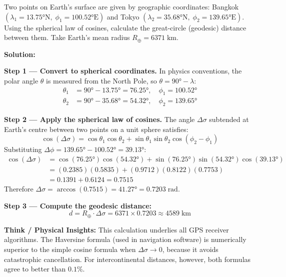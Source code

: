 \begin{psctexample}
Two points on Earth's surface are given by geographic coordinates: Bangkok $(\lambda_1 = 13.75°\text{N},\; \phi_1 = 100.52°\text{E})$ and Tokyo $(\lambda_2 = 35.68°\text{N},\; \phi_2 = 139.65°\text{E})$. Using the spherical law of cosines, calculate the great-circle (geodesic) distance between them. Take Earth's mean radius $R_\oplus = 6371\;\text{km}$.

\textbf{Solution:}

\textbf{Step 1 — Convert to spherical coordinates.}
In physics conventions, the polar angle $\theta$ is measured from the North Pole, so $\theta = 90° - \lambda$:
\begin{align}
\theta_1 &= 90° - 13.75° = 76.25°, \quad \phi_1 = 100.52° \\
\theta_2 &= 90° - 35.68° = 54.32°, \quad \phi_2 = 139.65°
\end{align}

\textbf{Step 2 — Apply the spherical law of cosines.}
The angle $\Delta\sigma$ subtended at Earth's centre between two points on a unit sphere satisfies:
\begin{equation}
\cos(\Delta\sigma) = \cos\theta_1\cos\theta_2 + \sin\theta_1\sin\theta_2\cos(\phi_2 - \phi_1)
\end{equation}
Substituting $\Delta\phi = 139.65° - 100.52° = 39.13°$:
\begin{align}
\cos(\Delta\sigma) &= \cos(76.25°)\cos(54.32°) + \sin(76.25°)\sin(54.32°)\cos(39.13°) \\
                   &= (0.2385)(0.5835) + (0.9712)(0.8122)(0.7753) \\
                   &= 0.1391 + 0.6124 = 0.7515
\end{align}
Therefore $\Delta\sigma = \arccos(0.7515) = 41.27°= 0.7203\;\text{rad}$.

\textbf{Step 3 — Compute the geodesic distance:}
\begin{equation}
\boxed{d = R_\oplus \cdot \Delta\sigma = 6371 \times 0.7203 \approx 4589\;\text{km}}
\end{equation}

\textbf{\color{rbruNavy}Think / Physical Insights:}
This calculation underlies all GPS receiver algorithms. The Haversine formula (used in navigation software) is numerically superior to the simple cosine formula when $\Delta\sigma \to 0$, because it avoids catastrophic cancellation. For intercontinental distances, however, both formulas agree to better than $0.1\%$.
\qedexam
\end{psctexample}

